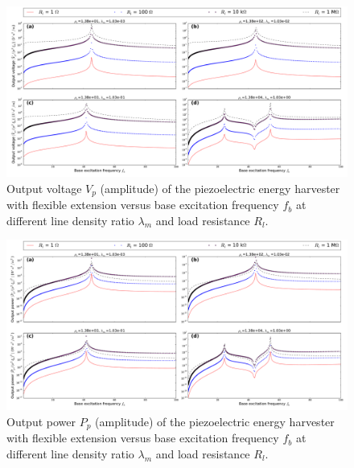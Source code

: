 \documentclass{elsarticle}
\begin{document}
\begin{figure}[!htbp]
    \centering
    \includegraphics[width=\textwidth]{./fig_output_voltage_vs_fr_Rl_lamm_all}
    \caption{Output voltage $V_p$ (amplitude) of the piezoelectric energy harvester with flexible extension versus base excitation frequency $f_b$ at different line density ratio $\lambda_m$ and load resistance $R_l$.}
    \label{fig:fig_output_voltage_vs_fr_Rl_lamm_all}
\end{figure}

\begin{figure}[!htbp]
    \centering
    \includegraphics[width=\textwidth]{./fig_output_power_vs_fr_Rl_lamm_all}
    \caption{Output power $P_p$ (amplitude) of the piezoelectric energy harvester with flexible extension versus base excitation frequency $f_b$ at different line density ratio $\lambda_m$ and load resistance $R_l$.}
    \label{fig:fig_output_power_vs_fr_Rl_lamm_all}
\end{figure}

\end{document}
